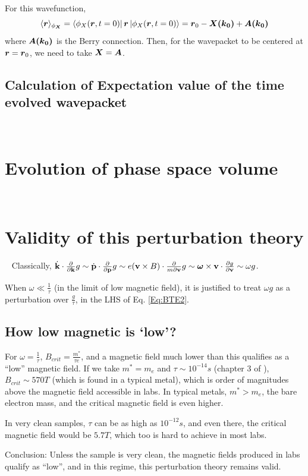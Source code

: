 \documentclass{revtex4-2}
\newcommand{\bvec}[1]{{\mathbf #1}}
\renewcommand\vec[1]{\ensuremath\boldsymbol{#1}} %
\begin{document}
For this wavefunction,
$$\langle \vec{r} \rangle_{\phi_{\vec{X}}} = \bra{\phi_X(\vec{r}, t=0)} \vec{r} \ket{\phi_X(\vec{r}, t=0)} = \vec{r}_0 - \vec{X(\vec{k}_0)} + \vec{A(\vec{k}_0)} $$
where  $\vec{A(\vec{k}_0)}$ is the Berry connection. Then, for the wavepacket to be centered at $\vec{r} = \vec{r}_0$, we need to take $\vec{X} = \vec{A}$.
\subsection{Calculation of Expectation value of the time evolved wavepacket}~\label{app:center-at-new-time}
\section{Evolution of phase space volume}~\label{app:phase-space-volume-evolution}

\section{Validity of this perturbation theory}~\label{app:perturbation_validation}
Classically, $\dot{\bvec{k}}\cdot\frac{\partial}{\partial \bvec{k}} g \sim \dot{\bvec{p}}\cdot\frac{\partial}{\partial \bvec{p}} g \sim e (\bvec{v}\times{B})\cdot\frac{\partial}{m\partial \bvec{v}} g \sim \vec{\omega} \times \bvec{v}\cdot \frac{\partial g}{\partial \bvec{v}} \sim \omega g$.

When $\omega \ll \frac{1}{\tau}$ (in the limit of low magnetic field), it is justified to treat $\omega g$ as a perturbation over $\frac{g}{\tau}$, in the LHS of Eq. \eqref{Eq:BTE2}.
\subsection{How low magnetic is `low'?}
For $\omega = \frac{1}{\tau}$, $B_{crit} = \frac{m^*}{\tau e}$, and a magnetic field much lower than this qualifies as a ``low'' magnetic field. If we take $m^* = m_e$ and $\tau \sim 10^{-14} s$ (chapter 3 of \cite{book:SimonSolidState}), $B_{crit} \sim 570 T$ (which is found in a typical metal), which is order of magnitudes above the magnetic field accessible in labs. In typical metals, $m^* > m_e$, the bare electron mass, and the critical magnetic field is even higher.

In very clean samples, $\tau$ can be as high as $10^{-12} s$, and even there, the critical magnetic field would be  $5.7 T$, which too is hard to achieve in most labs.

Conclusion: Unless the sample is very clean, the magnetic fields produced in labs qualify as ``low'', and in this regime, this perturbation theory remains valid.


\end{document}
